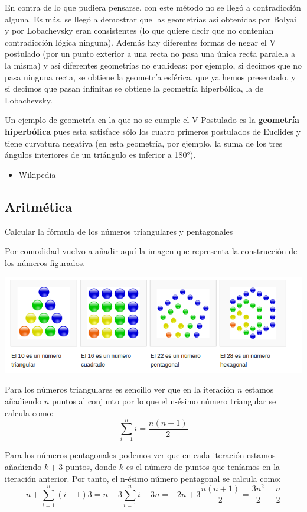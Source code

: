 \begin{problem}[21]
En contra de lo que pudiera pensarse, con este método no se llegó a contradicción alguna. Es más, se llegó a demostrar que las geometrías así obtenidas por Bolyai y por Lobachevsky eran consistentes (lo que quiere decir que no contenían contradicción lógica ninguna). Además hay diferentes formas de negar el V postulado (por un punto exterior a una recta no pasa una única recta paralela a la misma) y así diferentes geometrías no euclídeas: por ejemplo, si decimos que no pasa ninguna recta, se obtiene la geometría esférica, que ya hemos presentado, y si decimos que pasan infinitas se obtiene la geometría hiperbólica, la de Lobachevsky.

\obs Un ejemplo de geometría en la que no se cumple el V Postulado es la \textbf{geometría hiperbólica} pues esta satisface sólo los cuatro primeros postulados de Euclides y tiene curvatura negativa (en esta geometría, por ejemplo, la suma de los tres ángulos interiores de un triángulo es inferior a 180°).

\begin{itemize}
\item \href{https://es.wikipedia.org/wiki/Quinto_postulado_de_Euclides}{Wikipedia}
\end{itemize}
\end{problem}

\subsection{Aritmética}
\begin{problem}[22]
Calcular la fórmula de los números triangulares y pentagonales
\solution


Por comodidad vuelvo a añadir aquí la imagen que representa la construcción de los números figurados.

\begin{center}
\includegraphics[width=\textwidth]{img/numeros_poligonales.png}
\end{center}

Para los números triangulares es sencillo ver que en la iteración $n$ estamos añadiendo $n$ puntos al conjunto por lo que el n-ésimo número triangular se calcula como:
\[\sum_{i=1}^ni=\frac{n(n+1)}{2}\]

Para los números pentagonales podemos ver que en cada iteración estamos añadiendo $k+3$ puntos, donde $k$ es el número de puntos que teníamos en la iteración anterior. Por tanto, el n-ésimo número pentagonal se calcula como:
\[n+\sum_{i=1}^n(i-1)3 = n+3\sum_{i=1}^ni-3n=-2n+3\frac{n(n+1)}{2} = \frac{3n^2}{2}-\frac{n}{2}\]
\end{problem}

